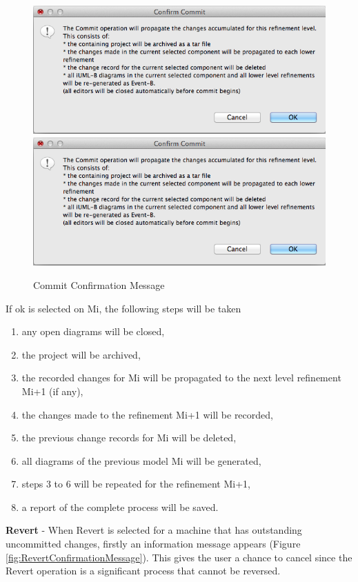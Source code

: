  \begin{figure}[!htbp]
  \centering
  \ifplastex
  \includegraphics[width=1024]{figures/image62.png}
  \else
  \includegraphics[width=1\textwidth]{figures/image62.png}
  \fi
  \caption{Commit Confirmation Message}
  \label{fig:CommitConfirmationMessage}
\end{figure} 

If ok is selected on Mi, the following steps will be taken
\begin{enumerate}
\item any open diagrams will be closed, 
\item the project will be archived,
\item the recorded changes for Mi will be propagated to the next level refinement Mi+1 (if any),
\item the changes made to the refinement Mi+1 will be recorded,
\item the previous change records for Mi will be deleted,
\item all diagrams of the previous model Mi will be generated,
\item steps 3 to 6 will be repeated for the refinement Mi+1,
\item a report of the complete process will be saved.
\end{enumerate}


\textbf{Revert} -
When Revert is selected for a machine that has outstanding uncommitted changes, firstly an information message appears (Figure \ref{fig:RevertConfirmationMessage}). This gives the user a chance to cancel since the Revert operation is a significant process that cannot be reversed.

